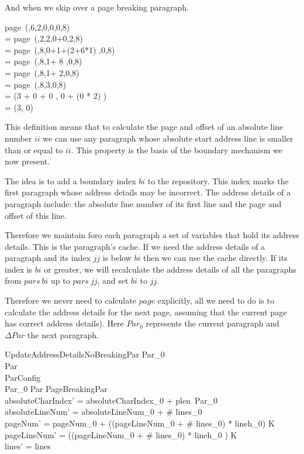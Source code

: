 \documentclass{article}
\begin{document}
And when we skip over a page breaking paragraph.

\begin{argue}
page~(,6,2\rangle,0,0,0,8) \\
= page~(,2\rangle,2,0+0,2,8) \\
= page~(\rangle,8,0+1+(2+6*1) ,0,8) \\
= page~(\rangle,8,1+ 8 ,0,8) \\
= page~(\rangle,8,1+ 2,0,8) \\
= page~(\rangle,8,3,0,8) \\
= (3 + 0 + 0 , 0 + (0 * 2) ) \\
= (3, 0)
\end{argue}

This definition means that to calculate the page and offset of an absolute line number $ii$ we can use any paragraph whose absolute start address line is smaller than or equal to $ii$. This property is the basis of the boundary mechanism we now present. 

The idea is to add a boundary index $bi$ to the repository. This index marks the first paragraph whose address details may be incorrect. The address details of a paragraph include: the absolute line number of its first line and the page and offset of this line. 

Therefore we maintain foro each paragraph a set of variables that hold its address details. This is the paragraph's cache. If we need the address details of a paragraph and its index $jj$ is below $bi$ then we can use the cache directly. If its index is $bi$ or greater, we will recalculate the address details of all the paragraphs from $pars~bi$ up to $pars~jj$, and set $bi$ to $jj$.

Therefore we never need to calculate $page$ explicitly, all we need to do is to calculate the address details for the next page, assuming that the current page has correct address details). Here $Par_0$ represents the current paragraph and $\Delta Par$ the next paragraph.

\begin{schema}{UpdateAddressDetailsNoBreakingPar}
	Par_0 \\
	\Delta Par \\
	\Xi ParConfig \\
\where
	\theta Par_0 \in Par \setminus PageBreakingPar \\
	absoluteCharIndex' = absoluteCharIndex_0 + plen~\theta Par_0 \\
	absoluteLineNum' = absoluteLineNum_0 + \# lines_0 \\
	pageNum' = pageNum_0 + ((pageLineNum_0 + \# lines_0) * lineh_0) \div K \\
	pageLineNum' = ((pageLineNum_0 + \# lines_0) * lineh_0 ) \mod K \\
	lines' = lines \\
\end{schema}
\end{document}

